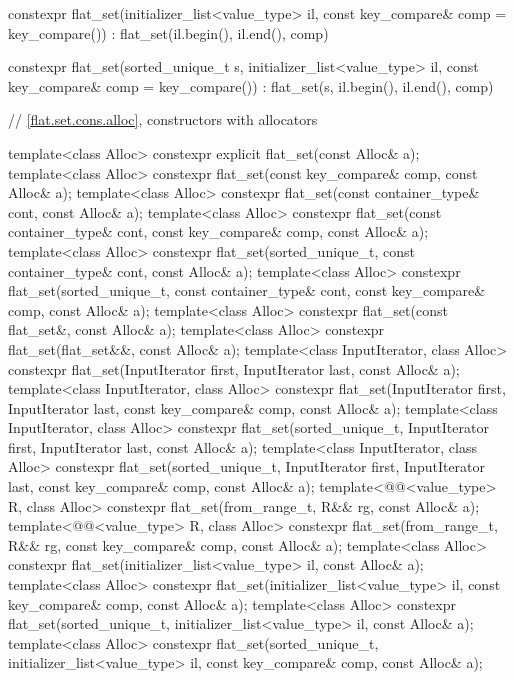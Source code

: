\begin{codeblock}
{{    constexpr flat_set(initializer_list<value_type> il, const key_compare& comp = key_compare())
        : flat_set(il.begin(), il.end(), comp) { }

    constexpr flat_set(sorted_unique_t s, initializer_list<value_type> il,
             const key_compare& comp = key_compare())
        : flat_set(s, il.begin(), il.end(), comp) { }

    // \ref{flat.set.cons.alloc}, constructors with allocators

    template<class Alloc>
      constexpr explicit flat_set(const Alloc& a);
    template<class Alloc>
      constexpr flat_set(const key_compare& comp, const Alloc& a);
    template<class Alloc>
      constexpr flat_set(const container_type& cont, const Alloc& a);
    template<class Alloc>
      constexpr flat_set(const container_type& cont, const key_compare& comp, const Alloc& a);
    template<class Alloc>
      constexpr flat_set(sorted_unique_t, const container_type& cont, const Alloc& a);
    template<class Alloc>
      constexpr flat_set(sorted_unique_t, const container_type& cont,
                         const key_compare& comp, const Alloc& a);
    template<class Alloc>
      constexpr flat_set(const flat_set&, const Alloc& a);
    template<class Alloc>
      constexpr flat_set(flat_set&&, const Alloc& a);
    template<class InputIterator, class Alloc>
      constexpr flat_set(InputIterator first, InputIterator last, const Alloc& a);
    template<class InputIterator, class Alloc>
      constexpr flat_set(InputIterator first, InputIterator last,
                         const key_compare& comp, const Alloc& a);
    template<class InputIterator, class Alloc>
      constexpr flat_set(sorted_unique_t, InputIterator first, InputIterator last,
                         const Alloc& a);
    template<class InputIterator, class Alloc>
      constexpr flat_set(sorted_unique_t, InputIterator first, InputIterator last,
                         const key_compare& comp, const Alloc& a);
    template<@@<value_type> R, class Alloc>
      constexpr flat_set(from_range_t, R&& rg, const Alloc& a);
    template<@@<value_type> R, class Alloc>
      constexpr flat_set(from_range_t, R&& rg, const key_compare& comp, const Alloc& a);
    template<class Alloc>
      constexpr flat_set(initializer_list<value_type> il, const Alloc& a);
    template<class Alloc>
      constexpr flat_set(initializer_list<value_type> il, const key_compare& comp,
                         const Alloc& a);
    template<class Alloc>
      constexpr flat_set(sorted_unique_t, initializer_list<value_type> il, const Alloc& a);
    template<class Alloc>
      constexpr flat_set(sorted_unique_t, initializer_list<value_type> il,
                         const key_compare& comp, const Alloc& a);

}}
\end{codeblock}
